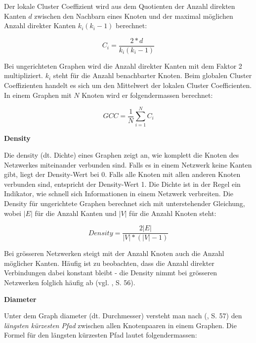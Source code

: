 Der lokale Cluster Coeffizient wird aus dem Quotienten der Anzahl direkten Kanten $d$ zwischen den Nachbarn eines Knoten und der maximal möglichen Anzahl direkter Kanten $k_i(k_i -1)$ berechnet:

\begin{equation}
    \label{eq:ci}
    C_i = \frac{2*d}{k_i(k_i-1)}
\end{equation}


Bei ungerichteten Graphen wird die Anzahl direkter Kanten mit dem Faktor 2 multipliziert. $k_i$ steht für die Anzahl benachbarter Knoten.
Beim globalen Cluster Coeffizienten handelt es sich um den Mittelwert der lokalen Cluster Coefficienten.
In einem Graphen mit $N$ Knoten wird er folgendermassen berechnet:

\begin{equation}
    \label{eq:gcc}
    GCC = \frac{1}{N}\sum\limits_{i=1}^{N}C_i
\end{equation}

\textbf{Density}

Die \acs{density} (dt. Dichte) eines Graphen zeigt an, wie komplett die Knoten des Netzwerkes miteinander verbunden sind.
Falls es in einem Netzwerk keine Kanten gibt, liegt der Density-Wert bei 0. Falls alle Knoten mit allen anderen Knoten verbunden sind, entspricht der Density-Wert 1.
Die Dichte ist in der Regel ein Indikator, wie schnell sich Informationen in einem Netzwerk verbreiten.
Die Density für ungerichtete Graphen berechnet sich mit unterstehender Gleichung, wobei $|E|$ für die Anzahl Kanten und $|V|$ für die Anzahl Knoten steht:

\begin{equation}
    \label{eq:density}
    Density = \frac{2|E|}{|V|*(|V|-1)}
\end{equation}


Bei grösseren Netzwerken steigt mit der Anzahl Knoten auch die Anzahl möglicher Kanten.
Häufig ist zu beobachten, dass die Anzahl direkter Verbindungen dabei konstant bleibt - die Density nimmt bei grösseren Netzwerken folglich häufig ab (vgl. \citeauthor{michael_henninger_soziale_2018} \citeyear{michael_henninger_soziale_2018}, S. 56).

\textbf{Diameter}

Unter dem Graph \acs{diameter} (dt. Durchmesser) versteht man nach \citeauthor{michael_henninger_soziale_2018} (\citeyear{michael_henninger_soziale_2018}, S. 57) den \textit{längsten kürzesten Pfad} zwischen allen Knotenpaaren in einem Graphen.
Die Formel für den längsten kürzesten Pfad lautet folgendermassen:

